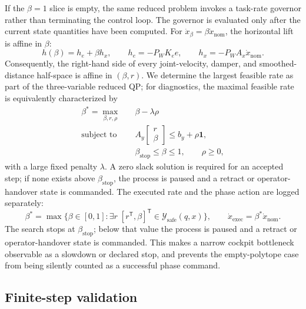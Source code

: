\documentclass[preprint,12pt]{elsarticle}
\newcommand{\T}{^{\mathsf T}}
\begin{document}
If the $\beta=1$ slice is empty, the same reduced problem invokes a task-rate governor rather than terminating the control loop. The governor is evaluated only after the current state quantities have been computed. For $\dot x_{\beta}=\beta\dot x_{\mathrm{nom}}$, the horizontal lift is affine in $\beta$:
\begin{equation}
h(\beta)=h_e+\beta h_x,
\qquad
h_e=-P_WK_e e,
\qquad
h_x=-P_WA_x\dot x_{\mathrm{nom}}.
\label{eq:governed_horizontal_components}
\end{equation}
Consequently, the right-hand side of every joint-velocity, damper, and smoothed-distance half-space is affine in $(\beta,r)$. We determine the largest feasible rate as part of the three-variable reduced QP; for diagnostics, the maximal feasible rate is equivalently characterized by
\begin{equation}
\begin{aligned}
\beta^*=\max_{\beta,r,\rho}\quad&\beta-\lambda\rho\\
\text{subject to}\quad& A_y\begin{bmatrix}r\\\beta\end{bmatrix}\leq b_y+\rho\mathbf 1,\\
&\beta_{\mathrm{stop}}\leq\beta\leq1,\qquad \rho\geq0,
\end{aligned}
\label{eq:governor_lp}
\end{equation}
with a large fixed penalty $\lambda$. A zero slack solution is required for an accepted step; if none exists above $\beta_{\mathrm{stop}}$, the process is paused and a retract or operator-handover state is commanded. The executed rate and the phase action are logged separately:
\begin{equation}
\beta^*=\max\{\beta\in[0,1]:\exists r\;[r\T,\beta]\T\in\mathcal Y_{\mathrm{safe}}(q,x)\},
\qquad
\dot x_{\mathrm{exec}}=\beta^*\dot x_{\mathrm{nom}}.
\label{eq:task_governor}
\end{equation}
The search stops at $\beta_{\mathrm{stop}}$; below that value the process is paused and a retract or operator-handover state is commanded. This makes a narrow cockpit bottleneck observable as a slowdown or declared stop, and prevents the empty-polytope case from being silently counted as a successful phase command.

\subsection{Finite-step validation}
\end{document}

